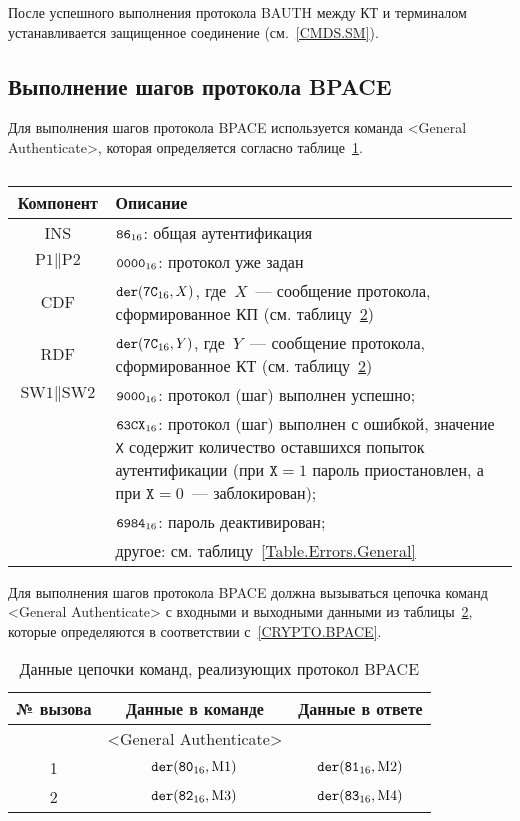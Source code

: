 После успешного выполнения протокола BAUTH между КТ и терминалом 
устанавливается защищенное соединение (см.~\ref{CMDS.SM}).

\subsection{Выполнение шагов протокола BPACE}
\label{Oper.Descr.GABPACE} 

Для выполнения шагов протокола BPACE 
используется команда <General Authenticate>,
которая определяется согласно 
таблице~\ref{Table.Oper.GABPACECmd}.

\begin{table}[hbt]
\caption{}\label{Table.Oper.GABPACECmd}
\begin{tabular}{|c|p{14cm}|}
\hline
Компонент & 	Описание \\
\hline
\hline
INS & $\texttt{86}_{16}$: общая аутентификация \\
\hline
$\text{P1} \parallel \text{P2}$ & $\texttt{0000}_{16}$: протокол уже задан\\ 
\hline
CDF & $\texttt{der}(\texttt{7C}_{16}, X)$, 
где~$X$~--- сообщение протокола, сформированное КП (см. 
таблицу~\ref{Table.Oper.BPACE})\\ 
\hline 
RDF & $\texttt{der}(\texttt{7C}_{16}, Y)$, где~$Y$~--- 
сообщение протокола, сформированное КТ (см. таблицу~\ref{Table.Oper.BPACE})\\
\hline
$\text{SW1} \parallel \text{SW2}$ & 
  $\texttt{9000}_{16}$: протокол (шаг) выполнен успешно; \\
  & $\texttt{63CX}_{16}$: протокол (шаг) выполнен с ошибкой, 
значение \texttt{X} содержит количество оставшихся попыток аутентификации 
(при $\texttt{X} = 1$ пароль приостановлен, а при $\texttt{X} = 0$~--- 
заблокирован); \\
  & $\texttt{6984}_{16}$: пароль деактивирован; \\
  & другое: см. таблицу~\ref{Table.Errors.General} \\
\hline
\end{tabular}
\end{table}

Для выполнения шагов протокола BPACE должна вызываться цепочка 
команд <General Authenticate> с входными и выходными данными 
из таблицы~\ref{Table.Oper.BPACE}, 
которые определяются в соответствии с~\ref{CRYPTO.BPACE}. 

\begin{table}[hbt]
\caption{Данные цепочки команд, реализующих протокол BPACE}
\label{Table.Oper.BPACE}
\begin{tabular}{|c|c|c|}
\hline
№ вызова & Данные в команде & Данные в ответе\\
\hline
\hline
 & <General Authenticate> &  \\
\hline
\hline
1 & $\texttt{der}(\texttt{80}_{16}, \text{M1})$ & 
$\texttt{der}(\texttt{81}_{16}, \text{M2})$\\
\hline
2 & $\texttt{der}(\texttt{82}_{16}, \text{M3})$ & 
$\texttt{der}(\texttt{83}_{16}, \text{M4})$\\
\hline
\end{tabular}
\end{table}

